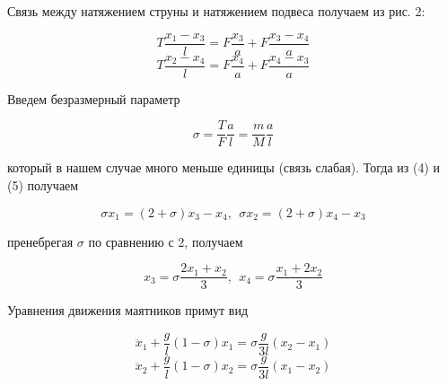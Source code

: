 \documentclass[14pt]{article}
\begin{document}
Связь между натяжением струны и натяжением подвеса получаем из рис. 2:

\begin{equation}
T\frac{x_1 - x_3}{l} = F\frac{x_3}{a} + F\frac{x_3 - x_4}{a}
\end{equation}
\begin{equation}
T\frac{x_2 - x_4}{l} = F\frac{x_4}{a} + F\frac{x_4 - x_3}{a}
\end{equation}

Введем безразмерный параметр

\begin{equation}
\sigma = \frac{T}{F} \frac{a}{l} = \frac{m}{M}\frac{a}{l}
\end{equation}

\noindent который в нашем случае много меньше единицы (связь слабая). Тогда из (4) и (5) получаем

\begin{equation}
\sigma x_1 = (2 + \sigma)x_3 - x_4,~~\sigma x_2 = (2 + \sigma)x_4 - x_3
\end{equation}

\noindent пренебрегая $\sigma$ по сравнению с 2, получаем

\begin{equation}
x_3 = \sigma\frac{2x_1 + x_2}{3},~~ x_4 = \sigma\frac{x_1 + 2x_2}{3}
\end{equation}

Уравнения движения маятников примут вид

\begin{equation}
\ddot x_1 + \frac{g}{l}(1 - \sigma)x_1 = \sigma\frac{g}{3l}(x_2 - x_1)
\end{equation}
\begin{equation}
\ddot x_2 + \frac{g}{l}(1 - \sigma)x_2 = \sigma\frac{g}{3l}(x_1 - x_2)
\end{equation}
\end{document}
